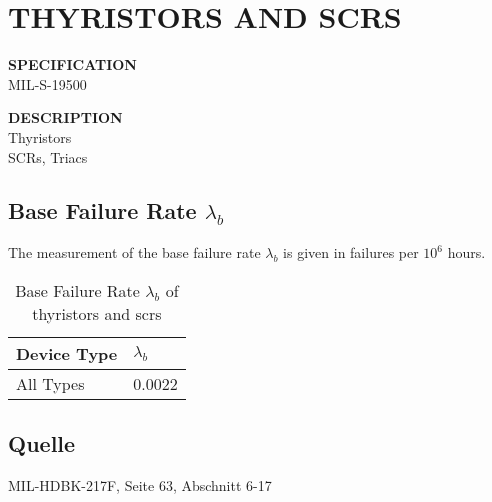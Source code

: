 \section{THYRISTORS AND SCRS}

\begin{minipage}[t]{0.29\textwidth}
    \textbf{SPECIFICATION}\\
    MIL-S-19500
\end{minipage}
\begin{minipage}[t]{0.7\textwidth}
    \textbf{DESCRIPTION}\\
    {\fontsize{12pt}{12pt}\selectfont Thyristors\\SCRs, Triacs}
\end{minipage}

\subsection{Base Failure Rate $\lambda_b$}
The measurement of the base failure rate $\lambda_b$ is given in failures per $10^6$ hours.
\begin{table}[ht]
{\centering

\begin{tabular}{|p{7.5cm}|p{5cm}|}
    \hline
    \textbf{Device Type} & \textbf{$\lambda_b$} \\
    \hline
    All Types & 0.0022 \\
    \hline
\end{tabular}

\caption{Base Failure Rate $\lambda_b$ of thyristors and scrs}

\label{tab:bfr_thyristors_and_scrs}
\par}
\subsection*{Quelle}
MIL-HDBK-217F, Seite 63, Abschnitt 6-17
\end{table}